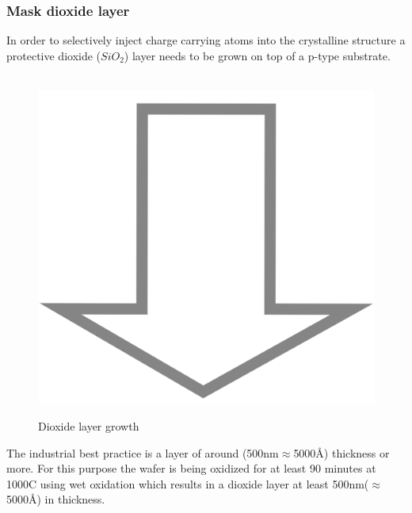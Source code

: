 \newpage

\subsubsection{Mask dioxide layer}
In order to selectively inject charge carrying atoms into the crystalline structure a protective dioxide ($SiO_2$) layer needs to be grown on top of a p-type substrate.
\begin{figure}[H]
	\centering
	\begin{tikzpicture}[node distance = 3cm, auto, thick,scale=\CrossSectionOnly, every node/.style={transform shape}]
		
	\end{tikzpicture} \\
	\includegraphics[scale=0.01]{down_arrow.png} \\
	\begin{tikzpicture}[node distance = 3cm, auto, thick,scale=\CrossSectionOnly, every node/.style={transform shape}]
		
	\end{tikzpicture}
	\caption{Dioxide layer growth}
\end{figure}
The industrial best practice is a layer of around (500nm$\approx$5000\normalfont\AA) thickness or more.
For this purpose the wafer is being oxidized for at least 90 minutes at 1000\degree C using wet oxidation which results in a dioxide layer at least 500nm($\approx$5000\normalfont\AA) in thickness.

